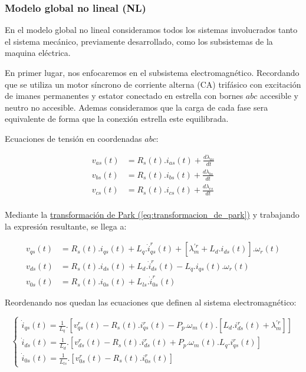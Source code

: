 \documentclass{article}
\begin{document}
\subsubsection{Modelo global no lineal (NL)}

En el modelo global no lineal consideramos todos los sistemas involucrados 
tanto el sistema mecánico, previamente desarrollado, como los subsistemas de la maquina eléctrica.

En primer lugar, nos enfocaremos en el subsistema electromagnético. Recordando que 
se utiliza un motor síncrono de corriente alterna (CA) trifásico con excitación de imanes 
permanentes y estator conectado en estrella con bornes $abc$ accesible y neutro no accesible.
Ademas consideramos que la carga de cada fase sera equivalente de forma que la conexión estrella este equilibrada.

Ecuaciones de tensión en coordenadas $abc$:

\begin{equation}\label{eq.tensiones_abc}
    \begin{aligned}
        v_{as}(t) &= R_{s}(t).i_{as}(t) + \frac{d\lambda_{as}}{dt}\\
        v_{bs}(t) &= R_{s}(t).i_{bs}(t) + \frac{d\lambda_{bs}}{dt}\\
        v_{cs}(t) &= R_{s}(t).i_{cs}(t) + \frac{d\lambda_{cs}}{dt}\\
    \end{aligned}
\end{equation}

Mediante la
\hyperref[eq:transformacion_de_park]{transformación de Park (\ref*{eq:transformacion_de_park})}
y trabajando la expresión resultante, se llega a:

\begin{equation}\label{eq.tensiones_qd0}
    \begin{aligned}
        v_{qs}(t) &= R_{s}(t).i_{qs}(t) + L_{q}.\dot{i}_{qs}^r(t) + [\lambda_{m}^{\prime r} + L_{d}.i_{ds}(t)].\omega_{r}(t)\\
        v_{ds}(t) &= R_{s}(t).i_{ds}(t) + L_{d}.\dot{i}_{ds}^r(t)  - L_{q}.i_{qs}(t).\omega_{r}(t)\\
        v_{0s}(t) &= R_{s}(t).i_{0s}(t) + L_{ls}.\dot{i}_{0s}^r(t)
    \end{aligned}
\end{equation}

Reordenando nos quedan las ecuaciones que definen al sistema electromagnético:

\begin{equation}\label{eq:mi_ecuacion}
    \begin{cases}
        \dot{i}_{qs}(t) = \frac{1}{L_{q}}.[v_{qs}^r(t) - R_{s}(t).i_{qs}^r(t) - P_{p}.\omega_{m}(t).[L_{d}.i_{ds}^r(t) + \lambda_{m}^{\prime r}]]  \\
        \dot{i}_{ds}(t) = \frac{1}{L_{d}}.[v_{ds}^r(t) - R_{s}(t).i_{ds}^r(t) + P_{p}.\omega_{m}(t).L_{q}.i_{qs}^r(t)]  \\
        \dot{i}_{0s}(t) = \frac{1}{L_{ls}}.[v_{0s}^r(t) - R_{s}(t).i_{0s}^r(t)]
    \end{cases}
\end{equation}
\end{document}

